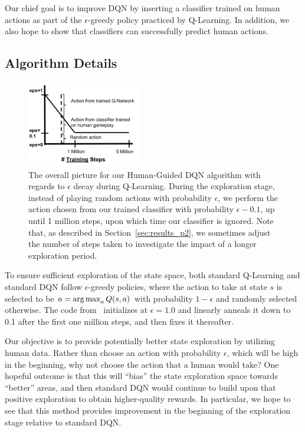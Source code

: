 \documentclass[letterpaper, 10pt, conference]{ieeeconf}
\begin{document}
Our chief goal is to improve DQN by inserting a classifier trained on human
actions as part of the $\epsilon$-greedy policy practiced by Q-Learning. In
addition, we also hope to show that classifiers can successfully predict human
actions.

\subsection{Algorithm Details}\label{ssec:algorithm}

\begin{figure}[t]
\centering
\includegraphics[width=0.45\textwidth]{figures/dqn_with_human_data_graph.png}
\caption{\footnotesize
The overall picture for our Human-Guided DQN algorithm with regards to
$\epsilon$ decay during Q-Learning. During the exploration stage, instead of
playing random actions with probability $\epsilon$, we perform the action chosen
from our trained classifier with probability $\epsilon-0.1$, up until 1 million
steps, upon which time our classifier is ignored. Note that, as described in
Section~\ref{sec:results_p2}, we sometimes adjust the number of steps taken to
investigate the impact of a longer exploration period.
}
\label{fig:human-guided-dqn}
\end{figure}

To ensure sufficient exploration of the state space, both standard Q-Learning
and standard DQN follow $\epsilon$-greedy policies, where the action to take at
state $s$ is selected to be $a = \operatorname*{arg\,max}_a Q(s,a)$ with probability $1-\epsilon$
and randomly selected otherwise. The code from~\cite{mnih-dqn-2015} initializes
at $\epsilon=1.0$ and linearly anneals it down to 0.1 after the first one
million steps, and then fixes it thereafter.

Our objective is to provide potentially better state exploration by utilizing
human data. Rather than choose an action with probability $\epsilon$, which will
be high in the beginning, why not choose the action that a human would take? One
hopeful outcome is that this will ``bias'' the state exploration space towards
``better'' areas, and then standard DQN would continue to build upon that
positive exploration to obtain higher-quality rewards. In particular, we hope to
see that this method provides improvement in the beginning of the exploration
stage relative to standard DQN.
\end{document}
